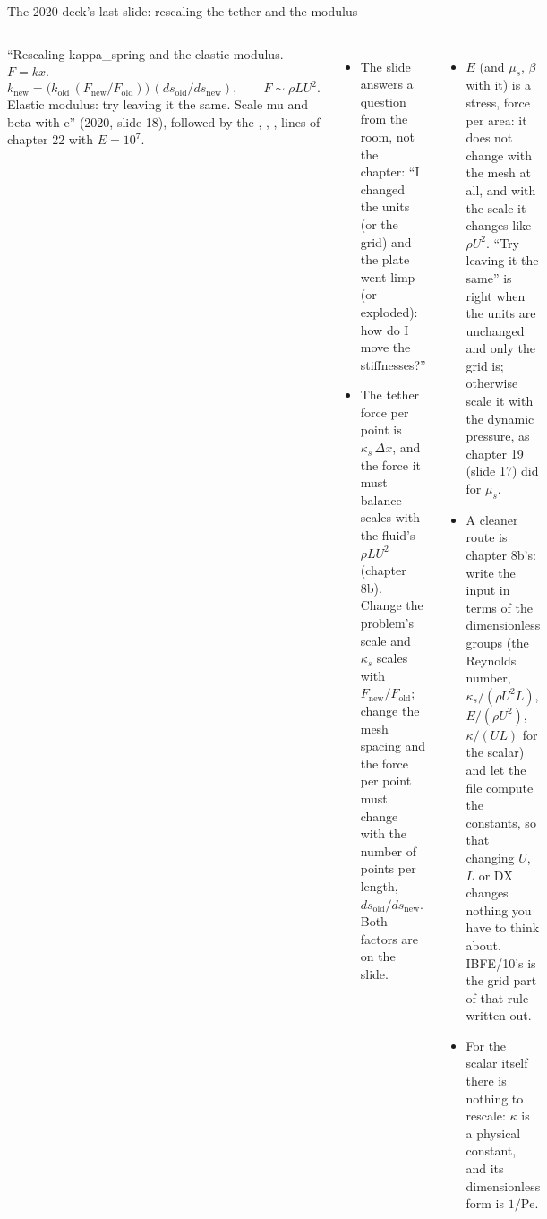 \documentclass[aspectratio=169,11pt]{beamer}
\begin{document}
\begin{frame}{The 2020 deck's last slide: rescaling the tether and the modulus}
\label{fr:rescale}
\scriptsize
\begin{columns}[T]
``Rescaling kappa\_spring and the elastic modulus. $F = kx$.
\[ k_{\mathrm{new}} = \bigl(k_{\mathrm{old}}\,(F_{\mathrm{new}}/F_{\mathrm{old}})\bigr)\,(ds_{\mathrm{old}}/ds_{\mathrm{new}}), \qquad F \sim \rho L U^2. \]
Elastic modulus: try leaving it the same. Scale mu and beta with e'' (2020, slide 18), followed by the , , ,  lines of chapter 22 with $E = 10^7$.
\begin{itemize}
  \item The slide answers a question from the room, not the chapter: ``I changed the units (or the grid) and the plate went limp (or exploded): how do I move the stiffnesses?''
  \item {} The tether force per point is $\kappa_s\,\Delta x$, and the force it must balance scales with the fluid's $\rho L U^2$ (chapter 8b). Change the problem's scale and $\kappa_s$ scales with $F_{\mathrm{new}}/F_{\mathrm{old}}$; change the mesh spacing and the force per point must change with the number of points per length, $ds_{\mathrm{old}}/ds_{\mathrm{new}}$. Both factors are on the slide.
\end{itemize}
\begin{itemize}
  \item {} $E$ (and $\mu_s$, $\beta$ with it) is a stress, force per area: it does not change with the mesh at all, and with the scale it changes like $\rho U^2$. ``Try leaving it the same'' is right when the units are unchanged and only the grid is; otherwise scale it with the dynamic pressure, as chapter 19 (slide 17) did for $\mu_s$.
  \item A cleaner route is chapter 8b's: write the input in terms of the dimensionless groups (the Reynolds number, $\kappa_s/(\rho U^2 L)$, $E/(\rho U^2)$, $\kappa/(UL)$ for the scalar) and let the file compute the constants, so that changing $U$, $L$ or $\mathrm{DX}$ changes nothing you have to think about. IBFE/10's  is the grid part of that rule written out.
  \item For the scalar itself there is nothing to rescale: $\kappa$ is a physical constant, and its dimensionless form is $1/\mathrm{Pe}$.
\end{itemize}
\end{columns}
\end{frame}
\end{document}

